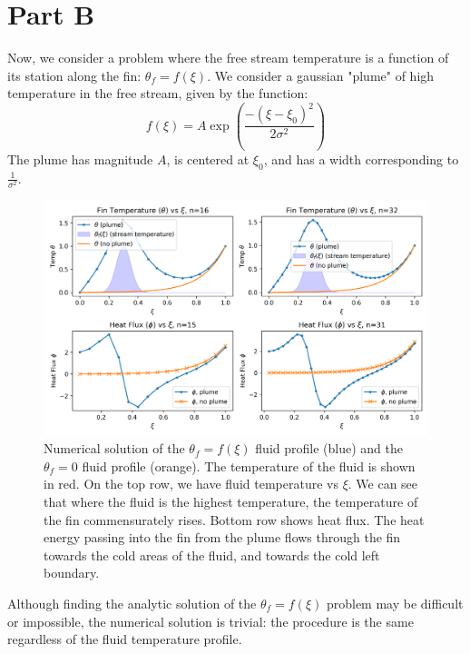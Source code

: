 \documentclass[10pt,letterpaper,notitlepage]{article}
\begin{document}
    \section{Part B}
    Now, we consider a problem where the free stream temperature is a function of its station along the fin: $\theta_f = f(\xi)$. We consider a gaussian "plume" of high temperature in the free stream, given by the function:
    \begin{equation}
        f(\xi) = A \exp{\left( \frac{-(\xi - \xi_0)^2}{2 \sigma^2} \right)}
    \end{equation}
    The plume has magnitude $A$, is centered at $\xi_0$, and has a width corresponding to $\frac{1}{\sigma ^2}$.
    \begin{figure}
        \centering
        \includegraphics[width=\textwidth]{figures/plume.png}
        \caption{Numerical solution of the $\theta_f = f(\xi)$ fluid profile (blue) and the $\theta_f = 0$ fluid profile (orange). The temperature of the fluid is shown in red. On the top row, we have fluid temperature vs $\xi$. We can see that where the fluid is the highest temperature, the temperature of the fin commensurately rises. Bottom row shows heat flux. The heat energy passing into the fin from the plume flows through the fin towards the cold areas of the fluid, and towards the cold left boundary.}
        \label{fig:plume}
    \end{figure}
    Although finding the analytic solution of the $\theta_f=f(\xi)$ problem may be difficult or impossible, the numerical solution is trivial: the procedure is the same regardless of the fluid temperature profile.
\end{document}
